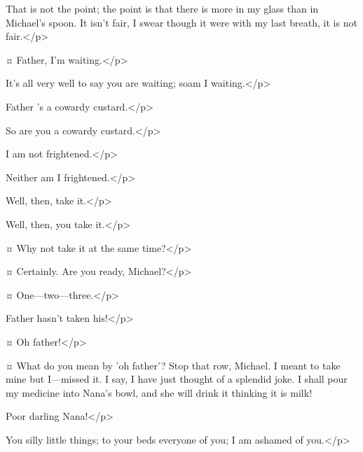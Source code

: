 \begin{drama}
\mrdarlingspeaks
That is not the point; the point is that there is more in my glass than in Michael's spoon.
It isn't fair, I swear though it were with my last breath, it is not fair.</p>

\michaelspeaks {}¤
Father, I'm waiting.</p>

\mrdarlingspeaks
It's all very well to say you are waiting; soam I waiting.</p>

\michaelspeaks
Father 's a cowardy custard.</p>

\mrdarlingspeaks
So are you a cowardy custard.</p>


\michaelspeaks
I am not frightened.</p>

\mrdarlingspeaks
Neither am I frightened.</p>

\michaelspeaks
Well, then, take it.</p>

\mrdarlingspeaks
Well, then, you take it.</p>

\wendyspeaks {}¤
Why not take it at the same time?</p>

\mrdarlingspeaks {}¤
Certainly.
Are you ready, Michael?</p>

\wendyspeaks {}¤
One—two—three.</p>


\johnspeaks
Father hasn't taken his!</p>


\wendyspeaks {}¤
Oh father!</p>

\mrdarlingspeaks {}¤
What do you mean by 'oh father'?
Stop that row, Michael.
I meant to take mine but I—missed it.
I say, I have just thought of a splendid joke.
I shall pour my medicine into Nana's bowl, and she will drink it thinking it is milk!

\wendyspeaks
Poor darling Nana!</p>

\mrdarlingspeaks
You silly little things; to your beds everyone of you; I am ashamed of you.</p>



\end{drama}
